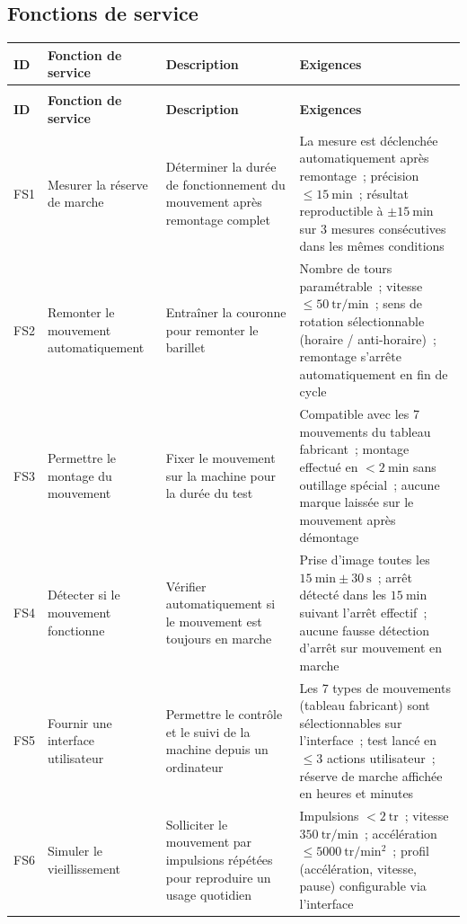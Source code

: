 \begin{landscape}

\subsection{Fonctions de service}

\label{tab:cahier-fs}
\begin{longtable}{|>{\raggedright\arraybackslash}p{1.5cm}|p{4cm}|p{6cm}|p{8cm}|}
\toprule
\textbf{ID} & \textbf{Fonction de service} & \textbf{Description} & \textbf{Exigences} \\
\midrule
\endfirsthead

\multicolumn{4}{c}{\tablename\ \thetable{} (suite)} \\
\toprule
\textbf{ID} & \textbf{Fonction de service} & \textbf{Description} & \textbf{Exigences} \\
\midrule
\endhead

\bottomrule
\endfoot

FS1 & Mesurer la réserve de marche
    & Déterminer la durée de fonctionnement du mouvement après remontage complet
    & La mesure est déclenchée automatiquement après remontage~; précision $\leq 15\ \mathrm{min}$~; résultat reproductible à $\pm 15\ \mathrm{min}$ sur 3 mesures consécutives dans les mêmes conditions \\
\hline
FS2 & Remonter le mouvement automatiquement
    & Entraîner la couronne pour remonter le barillet
    & Nombre de tours paramétrable~; vitesse $\leq 50\ \mathrm{tr/min}$~; sens de rotation sélectionnable (horaire / anti-horaire)~; remontage s'arrête automatiquement en fin de cycle \\
\hline
FS3 & Permettre le montage du mouvement
    & Fixer le mouvement sur la machine pour la durée du test
    & Compatible avec les 7 mouvements du tableau fabricant~; montage effectué en $< 2\ \mathrm{min}$ sans outillage spécial~; aucune marque laissée sur le mouvement après démontage \\
\hline
FS4 & Détecter si le mouvement fonctionne
    & Vérifier automatiquement si le mouvement est toujours en marche
    & Prise d'image toutes les $15\ \mathrm{min} \pm 30\ \mathrm{s}$~; arrêt détecté dans les $15\ \mathrm{min}$ suivant l'arrêt effectif~; aucune fausse détection d'arrêt sur mouvement en marche \\
\hline
FS5 & Fournir une interface utilisateur
    & Permettre le contrôle et le suivi de la machine depuis un ordinateur
    & Les 7 types de mouvements (tableau fabricant) sont sélectionnables sur l'interface~; test lancé en $\leq 3$ actions utilisateur~; réserve de marche affichée en heures et minutes \\
\hline
FS6 & Simuler le vieillissement
    & Solliciter le mouvement par impulsions répétées pour reproduire un usage quotidien
    & Impulsions $< 2\ \mathrm{tr}$~; vitesse $350\ \mathrm{tr/min}$~; accélération $\leq 5000\ \mathrm{tr/min^2}$~; profil (accélération, vitesse, pause) configurable via l'interface \\
\end{longtable}



\end{landscape}
